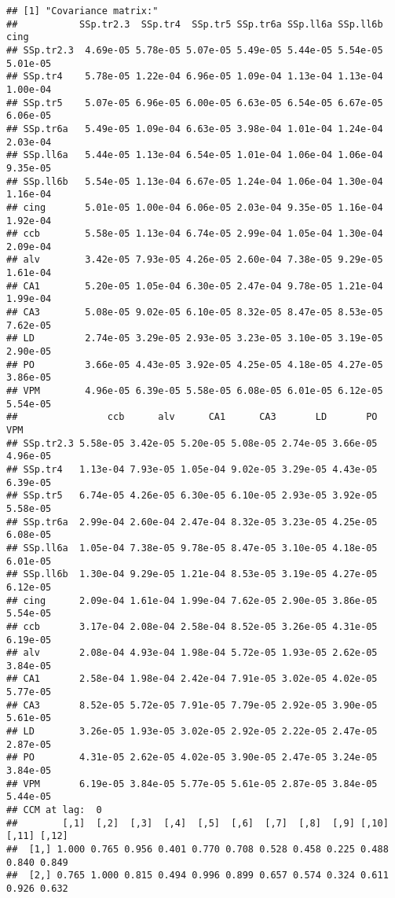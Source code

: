 \documentclass[
]{article}
\begin{document}
\begin{verbatim}
## [1] "Covariance matrix:"
##           SSp.tr2.3  SSp.tr4  SSp.tr5 SSp.tr6a SSp.ll6a SSp.ll6b     cing
## SSp.tr2.3  4.69e-05 5.78e-05 5.07e-05 5.49e-05 5.44e-05 5.54e-05 5.01e-05
## SSp.tr4    5.78e-05 1.22e-04 6.96e-05 1.09e-04 1.13e-04 1.13e-04 1.00e-04
## SSp.tr5    5.07e-05 6.96e-05 6.00e-05 6.63e-05 6.54e-05 6.67e-05 6.06e-05
## SSp.tr6a   5.49e-05 1.09e-04 6.63e-05 3.98e-04 1.01e-04 1.24e-04 2.03e-04
## SSp.ll6a   5.44e-05 1.13e-04 6.54e-05 1.01e-04 1.06e-04 1.06e-04 9.35e-05
## SSp.ll6b   5.54e-05 1.13e-04 6.67e-05 1.24e-04 1.06e-04 1.30e-04 1.16e-04
## cing       5.01e-05 1.00e-04 6.06e-05 2.03e-04 9.35e-05 1.16e-04 1.92e-04
## ccb        5.58e-05 1.13e-04 6.74e-05 2.99e-04 1.05e-04 1.30e-04 2.09e-04
## alv        3.42e-05 7.93e-05 4.26e-05 2.60e-04 7.38e-05 9.29e-05 1.61e-04
## CA1        5.20e-05 1.05e-04 6.30e-05 2.47e-04 9.78e-05 1.21e-04 1.99e-04
## CA3        5.08e-05 9.02e-05 6.10e-05 8.32e-05 8.47e-05 8.53e-05 7.62e-05
## LD         2.74e-05 3.29e-05 2.93e-05 3.23e-05 3.10e-05 3.19e-05 2.90e-05
## PO         3.66e-05 4.43e-05 3.92e-05 4.25e-05 4.18e-05 4.27e-05 3.86e-05
## VPM        4.96e-05 6.39e-05 5.58e-05 6.08e-05 6.01e-05 6.12e-05 5.54e-05
##                ccb      alv      CA1      CA3       LD       PO      VPM
## SSp.tr2.3 5.58e-05 3.42e-05 5.20e-05 5.08e-05 2.74e-05 3.66e-05 4.96e-05
## SSp.tr4   1.13e-04 7.93e-05 1.05e-04 9.02e-05 3.29e-05 4.43e-05 6.39e-05
## SSp.tr5   6.74e-05 4.26e-05 6.30e-05 6.10e-05 2.93e-05 3.92e-05 5.58e-05
## SSp.tr6a  2.99e-04 2.60e-04 2.47e-04 8.32e-05 3.23e-05 4.25e-05 6.08e-05
## SSp.ll6a  1.05e-04 7.38e-05 9.78e-05 8.47e-05 3.10e-05 4.18e-05 6.01e-05
## SSp.ll6b  1.30e-04 9.29e-05 1.21e-04 8.53e-05 3.19e-05 4.27e-05 6.12e-05
## cing      2.09e-04 1.61e-04 1.99e-04 7.62e-05 2.90e-05 3.86e-05 5.54e-05
## ccb       3.17e-04 2.08e-04 2.58e-04 8.52e-05 3.26e-05 4.31e-05 6.19e-05
## alv       2.08e-04 4.93e-04 1.98e-04 5.72e-05 1.93e-05 2.62e-05 3.84e-05
## CA1       2.58e-04 1.98e-04 2.42e-04 7.91e-05 3.02e-05 4.02e-05 5.77e-05
## CA3       8.52e-05 5.72e-05 7.91e-05 7.79e-05 2.92e-05 3.90e-05 5.61e-05
## LD        3.26e-05 1.93e-05 3.02e-05 2.92e-05 2.22e-05 2.47e-05 2.87e-05
## PO        4.31e-05 2.62e-05 4.02e-05 3.90e-05 2.47e-05 3.24e-05 3.84e-05
## VPM       6.19e-05 3.84e-05 5.77e-05 5.61e-05 2.87e-05 3.84e-05 5.44e-05
## CCM at lag:  0 
##        [,1]  [,2]  [,3]  [,4]  [,5]  [,6]  [,7]  [,8]  [,9] [,10] [,11] [,12]
##  [1,] 1.000 0.765 0.956 0.401 0.770 0.708 0.528 0.458 0.225 0.488 0.840 0.849
##  [2,] 0.765 1.000 0.815 0.494 0.996 0.899 0.657 0.574 0.324 0.611 0.926 0.632

\end{verbatim}
\end{document}
